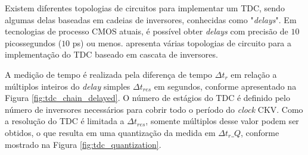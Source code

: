 Existem diferentes topologias de circuitos para implementar um TDC, sendo algumas delas baseadas em cadeias de inversores, conhecidas como "\textit{delays}". Em tecnologias de processo CMOS atuais, é possível obter \textit{delays} com precisão de $10$ picossegundos ($10$ ps) ou menos. \cite{ferreira2020review} apresenta várias topologias de circuito para a implementação do TDC baseado em cascata de inversores.

A medição de tempo é realizada pela diferença de tempo $\Delta t_r$ em relação a múltiplos inteiros do \textit{delay} simples $\Delta t_{res}$ em segundos, conforme apresentado na Figura \ref{fig:tdc_chain_delayed}. O número de estágios do TDC é definido pelo número de inversores necessários para cobrir todo o período do \textit{clock} CKV. Como a resolução do TDC é limitada a $\Delta t_{res}$, somente múltiplos desse valor podem ser obtidos, o que resulta em uma quantização da medida em $\Delta t_r\_Q$, conforme mostrado na Figura \ref{fig:tdc_quantization}.

%
%


%
%

